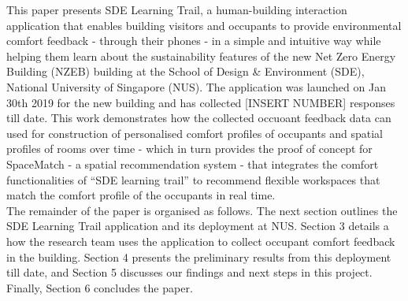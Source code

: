 This paper presents SDE Learning Trail, a human-building interaction application that enables building visitors and occupants to provide environmental comfort feedback - through their phones - in a simple and intuitive way while helping them learn about the sustainability features of the new Net Zero Energy Building (NZEB) building at the School of Design \& Environment (SDE), National University of Singapore (NUS). The application was launched on Jan 30th 2019 for the new building and has collected [INSERT NUMBER] responses till date. This work demonstrates how the collected occuoant feedback data can used for construction of personalised comfort profiles of occupants and spatial profiles of rooms over time - which in turn provides the proof of concept for SpaceMatch - a spatial recommendation system - that integrates the comfort functionalities of “SDE learning trail” to recommend flexible workspaces that match the comfort profile of the occupants in real time. \\


The remainder of the paper is organised as follows. The next section outlines the SDE Learning Trail application and its deployment at NUS. Section 3 details a how the research team uses the application to collect occupant comfort feedback in the building. Section 4 presents the preliminary results from this deployment till date, and Section 5 discusses our findings and next steps in this project. Finally, Section 6 concludes the paper. 







